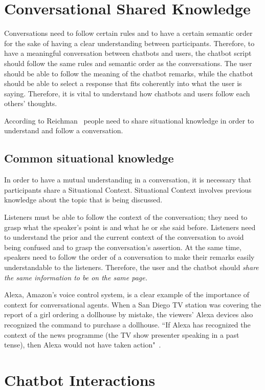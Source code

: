 \documentclass[a4paper,10pt]{article}
\begin{document}
\section{Conversational Shared Knowledge}

Conversations need to follow certain rules and to have a certain semantic order for the sake of having a clear understanding between participants. Therefore, to have a meaningful conversation between chatbots and users, the chatbot script should follow the same rules and semantic order as the conversations. The user should be able to follow the meaning of the chatbot remarks, while the chatbot should be able to select a response that fits coherently into what the user is saying. Therefore, it is vital to understand how chatbots and users follow each others' thoughts.

According to Reichman~\cite{reichman1985getting} people need to share situational knowledge in order to understand and follow a conversation.

\subsection{Common situational knowledge}
In order to have a mutual understanding in a conversation, it is necessary that participants share a Situational Context. Situational Context involves previous knowledge about the topic that is being discussed.

Listeners must be able to follow the context of the conversation; they need to grasp what the speaker's point is and what he or she said before. Listeners need to understand the prior and the current context of the conversation to avoid being confused and to grasp the conversation's assertion. At the same time, speakers need to follow the order of a conversation to make their remarks easily understandable to the listeners. Therefore, the user and the chatbot should \textit{share the same information to be on the same page.} 

Alexa, Amazon's voice control system, is a clear example of the importance of context for conversational agents. When  a San Diego TV station was covering the report of a girl ordering a dollhouse by mistake, the viewers' Alexa devices also recognized the command to purchase a dollhouse. ``If Alexa has recognized the context of the news programme (the TV show presenter speaking in a past tense), then Alexa would not have taken action"~\cite{WhatwecanlearnfromAlexasmistakes}.

\section{Chatbot Interactions}
\end{document}
